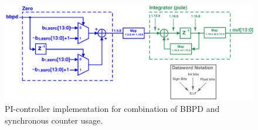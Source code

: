 			\begin{figure}[htb!]
			        \centering
			        \includegraphics[width=\textwidth, angle=0]{./figs/design/mux_datapath2}
			    \caption{PI-controller implementation for combination of BBPD and synchronous counter usage.}
			    \label{fig:pi_dig_imp}
			\end{figure}

